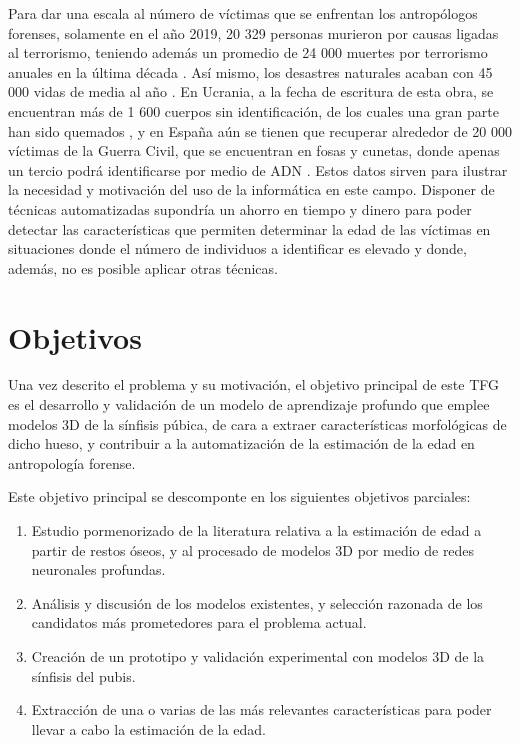 Para dar una escala al número de víctimas que se enfrentan los antropólogos forenses, solamente en el año 2019, 20 329 personas murieron por causas ligadas al terrorismo, teniendo además un promedio de 24 000 muertes por terrorismo anuales en la última década \cite{ritchie_terrorism_2013}. Así mismo, los desastres naturales acaban con 45 000 vidas de media al año \cite{ritchie_natural_2014}. En Ucrania, a la fecha de escritura de esta obra, se encuentran más de 1 600 cuerpos sin identificación, de los cuales una gran parte han sido quemados \cite{petrenko_more_2022}, y en España aún se tienen que recuperar alrededor de 20 000 víctimas de la Guerra Civil, que se encuentran en fosas y cunetas, donde apenas un tercio podrá identificarse por medio de ADN \cite{junquera_huellas_2022}. Estos datos sirven para ilustrar la necesidad y motivación del uso de la informática en este campo. Disponer de técnicas automatizadas supondría un ahorro en tiempo y dinero para poder detectar las características que permiten determinar la edad de las víctimas en situaciones donde el número de individuos a identificar es elevado y donde, además, no es posible aplicar otras técnicas.

\section{Objetivos}
Una vez descrito el problema y su motivación, el objetivo principal de este TFG es el desarrollo y validación de un modelo de aprendizaje profundo que emplee modelos 3D de la sínfisis púbica, de cara a extraer características morfológicas de dicho hueso, y contribuir a la automatización de la estimación de la edad en antropología forense.

Este objetivo principal se descomponte en los siguientes objetivos parciales:

\begin{enumerate}
    \item Estudio pormenorizado de la literatura relativa a la estimación de edad a partir de restos óseos, y al procesado de modelos 3D por medio de redes neuronales profundas.
    \item Análisis y discusión de los modelos existentes, y selección razonada de los candidatos más prometedores para el problema actual.
    \item Creación de un prototipo y validación experimental con modelos 3D de la sínfisis del pubis.
    \item Extracción de una o varias de las más relevantes características para poder llevar a cabo la estimación de la edad. 
\end{enumerate}

